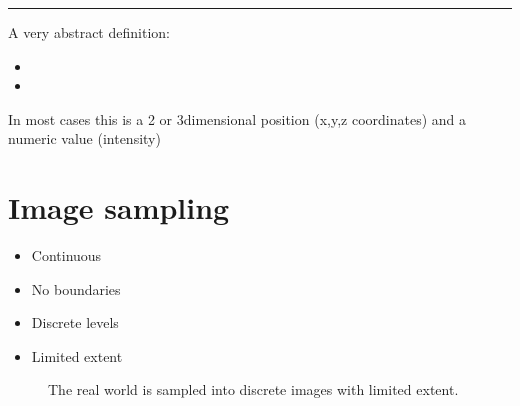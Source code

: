 \documentclass[letterpaper,10pt,english]{sphinxmanual}
\begin{document}
\bigskip\hrule\bigskip


\sphinxAtStartPar
A very abstract definition:
\begin{itemize}
\item {} 
\sphinxAtStartPar
{}

\item {} 
\sphinxAtStartPar
{}

\end{itemize}

\sphinxAtStartPar
In most cases this is a 2\sphinxhyphen{} or 3\sphinxhyphen{}dimensional position (x,y,z coordinates) and a numeric value (intensity)


\section{Image sampling}
\label{\detokenize{01-Introduction:image-sampling}}



\begin{itemize}
\item {} 
\sphinxAtStartPar
Continuous

\item {} 
\sphinxAtStartPar
No boundaries

\end{itemize}


\begin{itemize}
\item {} 
\sphinxAtStartPar
Discrete levels

\item {} 
\sphinxAtStartPar
Limited extent

\end{itemize}



\begin{figure}[htbp]
\centering
\capstart

\noindent{}
\caption{The real world is sampled into discrete images with limited extent.}\label{\detokenize{01-Introduction:id7}}\end{figure}
\end{document}
